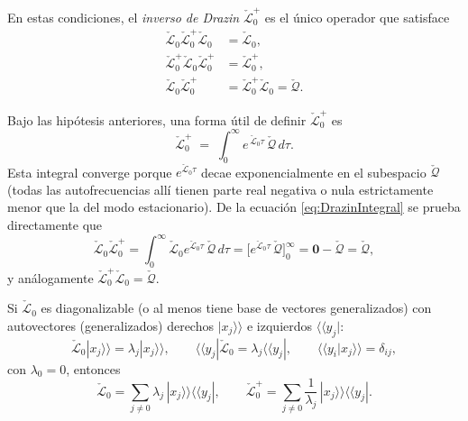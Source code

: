 \begin{appendixs}
En estas condiciones, el \emph{inverso de Drazin} $\check{\mathcal{L}}_{0}^{+}$ es el único operador que satisface
\begin{align*}
    \check{\mathcal{L}}_{0}\check{\mathcal{L}}_{0}^{+}\check{\mathcal{L}}_{0} &= \check{\mathcal{L}}_{0},\\
    \check{\mathcal{L}}_{0}^{+}\check{\mathcal{L}}_{0}\check{\mathcal{L}}_{0}^{+} &= \check{\mathcal{L}}_{0}^{+},\\
    \check{\mathcal{L}}_{0}\check{\mathcal{L}}_{0}^{+} &= \check{\mathcal{L}}_{0}^{+}\check{\mathcal{L}}_{0} = \check{\mathcal{Q}}.
\end{align*}


Bajo las hipótesis anteriores, una forma útil  de definir
$\check{\mathcal{L}}_{0}^{+}$ es
\begin{equation}
    \check{\mathcal{L}}_{0}^{+} \;=\; \int_{0}^{\infty} e^{\,\check{\mathcal{L}}_{0}\tau}\,\check{\mathcal{Q}}\, d\tau .
    \label{eq:DrazinIntegral}
\end{equation}
Esta integral converge porque $e^{\check{\mathcal{L}}_{0}\tau}$ decae exponencialmente en el
subespacio $\check{\mathcal{Q}}$ (todas las autofrecuencias allí tienen parte real negativa o nula
estrictamente menor que la del modo estacionario). De la ecuación \eqref{eq:DrazinIntegral} se prueba directamente que
\[
\check{\mathcal{L}}_{0}\check{\mathcal{L}}_{0}^{+}
= \int_{0}^{\infty} \check{\mathcal{L}}_{0} e^{\check{\mathcal{L}}_{0}\tau}\,\check{\mathcal{Q}}\, d\tau
= \Big[ e^{\check{\mathcal{L}}_{0}\tau}\,\check{\mathcal{Q}}\Big]_{0}^{\infty}
= \mathbf{0}-\check{\mathcal{Q}} = \check{\mathcal{Q}},
\]
y análogamente $\check{\mathcal{L}}_{0}^{+}\check{\mathcal{L}}_{0}=\check{\mathcal{Q}}$.


Si $\check{\mathcal{L}}_{0}$ es diagonalizable (o al menos tiene base de vectores generalizados) con
autovectores (generalizados) derechos $|x_{j}\rangle\rangle$ e izquierdos $\langle\langle y_{j}|$:
\[
\check{\mathcal{L}}_{0}|x_{j}\rangle\rangle=\lambda_{j}|x_{j}\rangle\rangle,\qquad
\langle\langle y_{j}|\check{\mathcal{L}}_{0}=\lambda_{j}\langle\langle y_{j}|,\qquad
\langle\langle y_{i}|x_{j}\rangle\rangle=\delta_{ij},
\]
con $\lambda_{0}=0$, entonces
\begin{equation*}
    \check{\mathcal{L}}_{0}
    = \sum_{j\neq 0}\lambda_{j}\,|x_{j}\rangle\rangle\langle\langle y_{j}|, \qquad
    \check{\mathcal{L}}_{0}^{+}
    = \sum_{j\neq 0}\frac{1}{\lambda_{j}}\,|x_{j}\rangle\rangle\langle\langle y_{j}|.
\end{equation*}


\end{appendixs}
